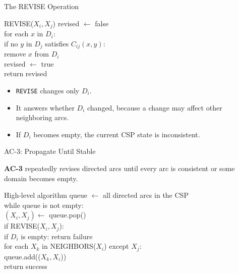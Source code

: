 \documentclass[aspectratio=169,10pt]{beamer}
\begin{document}
\begin{frame}[shrink=20]{The REVISE Operation}
  \begin{block}{REVISE($X_i,X_j$)}
  \ttfamily\small
  revised $\leftarrow$ false\\
  for each $x$ in $D_i$:\\
  \quad if no $y$ in $D_j$ satisfies $C_{ij}(x,y)$:\\
  \qquad remove $x$ from $D_i$\\
  \qquad revised $\leftarrow$ true\\
  return revised
  \end{block}

  \begin{itemize}
    \item \texttt{REVISE} changes only $D_i$.
    \item It answers whether $D_i$ changed, because a change may affect other neighboring arcs.
    \item If $D_i$ becomes empty, the current CSP state is inconsistent.
  \end{itemize}
\end{frame}

\begin{frame}[shrink=20]{AC-3: Propagate Until Stable}
  \begin{cpdefinition}
    \textbf{AC-3} repeatedly revises directed arcs until every arc is consistent or some domain becomes empty.
  \end{cpdefinition}

  \begin{block}{High-level algorithm}
  \ttfamily\small
  queue $\leftarrow$ all directed arcs in the CSP\\[0.03in]
  while queue is not empty:\\
  \quad $(X_i,X_j) \leftarrow$ queue.pop()\\
  \quad if REVISE($X_i,X_j$):\\
  \qquad if $D_i$ is empty: return failure\\
  \qquad for each $X_k$ in NEIGHBORS($X_i$) except $X_j$:\\
  \qquad\quad queue.add(($X_k,X_i$))\\
  return success
  \end{block}
\end{frame}
\end{document}
